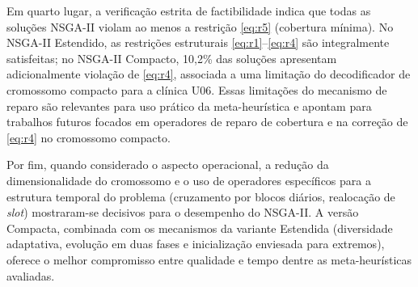 Em quarto lugar, a verificação estrita de factibilidade indica que todas as soluções NSGA-II violam ao menos a restrição \ref{eq:r5} (cobertura mínima). No NSGA-II Estendido, as restrições estruturais \ref{eq:r1}--\ref{eq:r4} são integralmente satisfeitas; no NSGA-II Compacto, 10{,}2\% das soluções apresentam adicionalmente violação de \ref{eq:r4}, associada a uma limitação do decodificador de cromossomo compacto para a clínica U06. Essas limitações do mecanismo de reparo são relevantes para uso prático da meta-heurística e apontam para trabalhos futuros focados em operadores de reparo de cobertura e na correção de \ref{eq:r4} no cromossomo compacto.

Por fim, quando considerado o aspecto operacional, a redução da dimensionalidade do cromossomo e o uso de operadores específicos para a estrutura temporal do problema (cruzamento por blocos diários, realocação de \textit{slot}) mostraram-se decisivos para o desempenho do NSGA-II. A versão Compacta, combinada com os mecanismos da variante Estendida (diversidade adaptativa, evolução em duas fases e inicialização enviesada para extremos), oferece o melhor compromisso entre qualidade e tempo dentre as meta-heurísticas avaliadas.